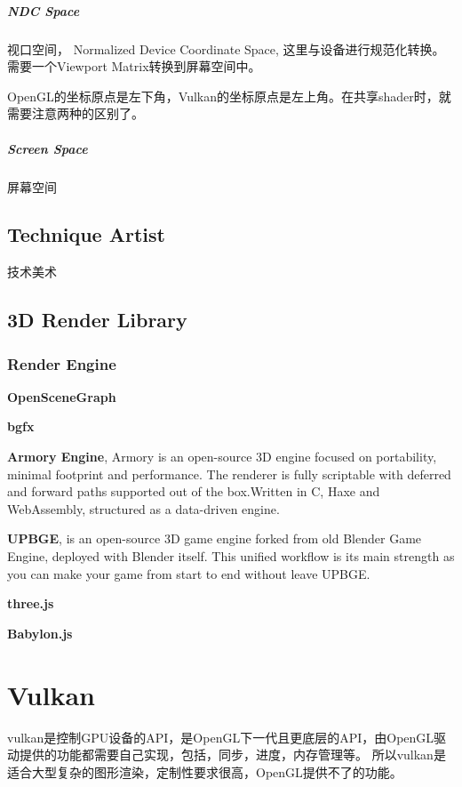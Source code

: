 \paragraph{NDC Space}
视口空间， Normalized Device Coordinate Space, 这里与设备进行规范化转换。
需要一个Viewport Matrix转换到屏幕空间中。

OpenGL的坐标原点是左下角，Vulkan的坐标原点是左上角。在共享shader时，就需要注意两种的区别了。


\paragraph{Screen Space}
屏幕空间

\section{Technique Artist}
技术美术

\section{3D Render Library}

\subsection{Render Engine}

\textbf{OpenSceneGraph}

\textbf{bgfx}

\textbf{Armory Engine}\cite{Armory}, Armory is an open-source 3D engine focused on portability, minimal footprint and performance. The renderer is fully scriptable with deferred and forward paths supported out of the box.Written in C, Haxe and WebAssembly, structured as a data-driven engine.

\textbf{UPBGE}\cite{upbge}, is an open-source 3D game engine forked from old Blender Game Engine, deployed with Blender itself. This unified workflow is its main strength as you can make your game from start to end without leave UPBGE.

\textbf{three.js}

\textbf{Babylon.js}


\chapter{Vulkan}

vulkan是控制GPU设备的API，是OpenGL下一代且更底层的API，由OpenGL驱动提供的功能都需要自己实现，包括，同步，进度，内存管理等。
所以vulkan是适合大型复杂的图形渲染，定制性要求很高，OpenGL提供不了的功能。

